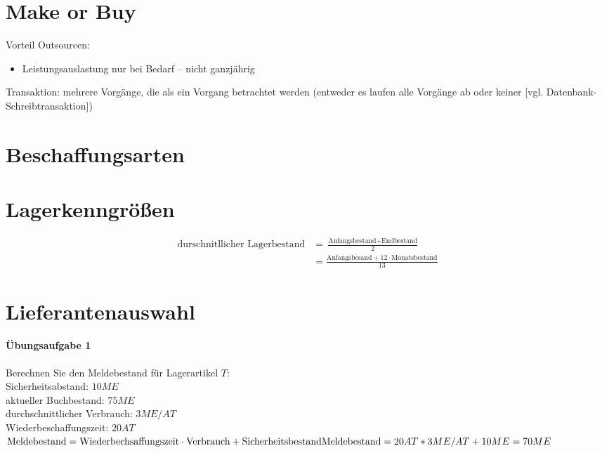 \documentclass{scrreprt}
\begin{document}
\section{Make or Buy}
Vorteil Outsourcen:
\begin{itemize}
\item Leistungsauslastung nur bei Bedarf -- nicht ganzjährig
\end{itemize}
Transaktion: mehrere Vorgänge, die als ein Vorgang betrachtet werden (entweder es laufen alle Vorgänge ab oder keiner [vgl. Datenbank-Schreibtransaktion])
\section{Beschaffungsarten}
\section{Lagerkenngrößen}
\begin{align*}
\text{durschnitllicher Lagerbestand} &=\frac{\text{Anfangsbestand}+\text{Endbestand}}{2}\\
&= \frac{\text{Anfangsbesand}+12 \cdot \text{Monatsbestand}}{13}
\end{align*}
\section{Lieferantenauswahl}
\paragraph{Übungsaufgabe 1} Berechnen Sie den Meldebestand für Lagerartikel $T$:\\
Sicherheitsabstand: $10ME$\\
aktueller Buchbestand: $75ME$\\
durchschnittlicher Verbrauch: $3ME/AT$\\
Wiederbeschaffungszeit: $20AT$\bigskip\\
$\text{Meldebestand} = \text{Wiederbechsaffungszeit}\cdot \text{Verbrauch}+\text{Sicherheitsbestand}\\
\text{Meldebestand}=20AT*3ME/AT+10ME=70ME $
\end{document}
